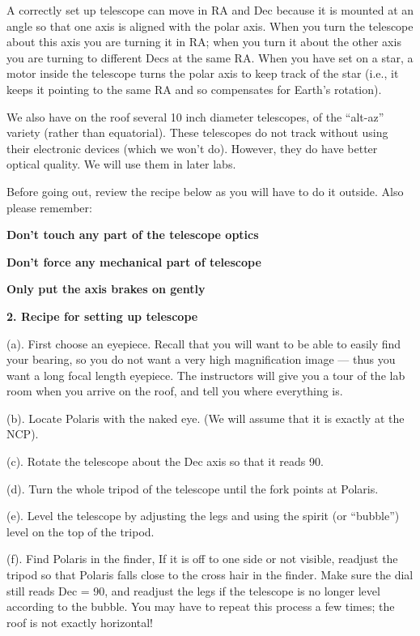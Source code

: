 \noindent
A correctly set up telescope can move in RA and Dec because it is
mounted at an angle so that one axis is aligned with the polar
axis. When you turn the telescope about this axis you are turning it
in RA; when you turn it about the other axis you are turning to
different Decs at the same RA. When you have set on a star, a motor
inside the telescope turns the polar axis to keep track of the star
(i.e., it keeps it pointing to the same RA and so compensates for
Earth's rotation). 

\noindent
We also have on the roof several 10 inch diameter telescopes, of the
``alt-az'' variety (rather than equatorial).  These telescopes do not
track without using their electronic devices (which we won't
do). However, they do have better optical quality. We will use them in
later labs.

\medskip\noindent
Before going out, review the recipe below as you will have to do it
outside. Also please remember:

\bigskip
\centerline{\bf Don't touch any part of the telescope optics} 


\medskip
\centerline{\bf Don't force any mechanical part of telescope} 

\medskip
\centerline{\bf Only put the axis brakes on gently}

\medskip
\medskip
\bigskip
\noindent
{\bf 2. Recipe for setting up telescope}

\medskip\noindent (a). First choose an eyepiece.  Recall that you will
want to be able to easily find your bearing, so you do not want a very
high magnification image --- thus you want a long focal length
eyepiece. The instructors will give you a tour of the lab room when
you arrive on the roof, and tell you where everything is.

\medskip\noindent
(b). Locate Polaris with the naked eye. (We will assume that it is
exactly at the NCP).

\medskip\noindent
(c). Rotate the telescope about the Dec axis so that it reads 90\deg.

\medskip\noindent (d). Turn the whole tripod of the telescope until
the fork points at Polaris. 

\medskip\noindent (e). Level the telescope by adjusting the legs and
using the spirit (or ``bubble'') level on the top of the tripod. 

\medskip\noindent (f).  Find Polaris in the finder, If it is off to
one side or not visible, readjust the tripod so that Polaris falls
close to the cross hair in the finder. Make sure the dial still reads
Dec = 90\deg, and readjust the legs if the telescope is no longer
level according to the bubble. You may have to repeat this process a
few times; the roof is not exactly horizontal!

